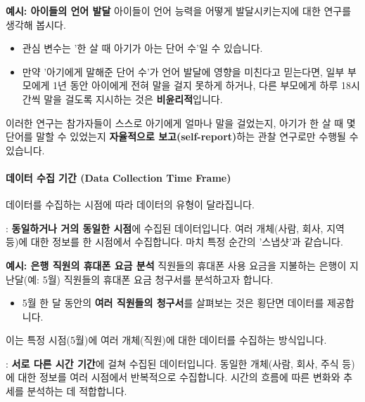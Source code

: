 \documentclass[11pt,a4paper]{article}
\theoremstyle{definition}
\begin{document}
\begin{examplebox}
\textbf{예시: 아이들의 언어 발달}
아이들이 언어 능력을 어떻게 발달시키는지에 대한 연구를 생각해 봅시다.
\begin{itemize}
    \item 관심 변수는 '한 살 때 아기가 아는 단어 수'일 수 있습니다.
    \item 만약 '아기에게 말해준 단어 수'가 언어 발달에 영향을 미친다고 믿는다면, 일부 부모에게 1년 동안 아이에게 전혀 말을 걸지 못하게 하거나, 다른 부모에게 하루 18시간씩 말을 걸도록 지시하는 것은 \textbf{비윤리적}입니다.
\end{itemize}
이러한 연구는 참가자들이 스스로 아기에게 얼마나 말을 걸었는지, 아기가 한 살 때 몇 단어를 말할 수 있었는지 \textbf{자율적으로 보고(self-report)}하는 관찰 연구로만 수행될 수 있습니다.
\end{examplebox}

\paragraph{데이터 수집 기간 (Data Collection Time Frame)}
데이터를 수집하는 시점에 따라 데이터의 유형이 달라집니다.

\begin{tcolorbox}[infobox, title={데이터 수집 기간 (1/2): 횡단면 데이터 (Cross-Sectional Data)}]
: \textbf{동일하거나 거의 동일한 시점}에 수집된 데이터입니다. 여러 개체(사람, 회사, 지역 등)에 대한 정보를 한 시점에서 수집합니다. 마치 특정 순간의 '스냅샷'과 같습니다.
\end{tcolorbox}

\begin{examplebox}
\textbf{예시: 은행 직원의 휴대폰 요금 분석}
직원들의 휴대폰 사용 요금을 지불하는 은행이 지난달(예: 5월) 직원들의 휴대폰 요금 청구서를 분석하고자 합니다.
\begin{itemize}
    \item 5월 한 달 동안의 \textbf{여러 직원들의 청구서}를 살펴보는 것은 횡단면 데이터를 제공합니다.
\end{itemize}
이는 특정 시점(5월)에 여러 개체(직원)에 대한 데이터를 수집하는 방식입니다.
\end{examplebox}

\begin{tcolorbox}[infobox, title={데이터 수집 기간 (2/2): 시계열 데이터 (Time-Series Data)}]
: \textbf{서로 다른 시간 기간}에 걸쳐 수집된 데이터입니다. 동일한 개체(사람, 회사, 주식 등)에 대한 정보를 여러 시점에서 반복적으로 수집합니다. 시간의 흐름에 따른 변화와 추세를 분석하는 데 적합합니다.
\end{tcolorbox}
\end{document}
